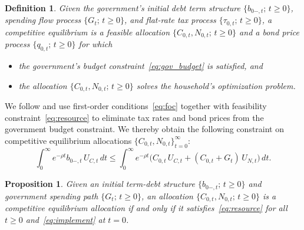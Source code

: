 \documentclass[12pt]{article}
\newtheorem{definition}{Definition}
\newtheorem{proposition}{Proposition}
\newcommand{\NW}[1]{{\textcolor{blue}{#1}}}
\newcommand{\WJ}[1]{{\textcolor{red}{#1}}}
\begin{document}
{%
{\begin{definition}\label{def:CE}
	Given the government's initial debt term structure $\{b_{0-,t};\, t \ge 0\}$, spending flow process $\{G_t;\, t \ge 0\}$, and  flat-rate tax process $\{\tau_{0,t};\, t \ge 0\}$, a competitive equilibrium is a feasible allocation $\{C_{0,t}, N_{0,t};\, t \ge 0\}$ and a bond price process $\{q_{0,t};\, t \ge 0\}$ for which
	\begin{itemize}
		\item the government's budget constraint~\eqref{eq:gov_budget} is satisfied, and
		\item the allocation $\{C_{0,t}, N_{0,t};\, t \ge 0\}$ solves the household's optimization problem.
	\end{itemize}
\end{definition}
}
We follow \cite{LucasStokey1983} and use first-order conditions~\eqref{eq:foc} together with feasibility constraint~\eqref{eq:resource} to eliminate tax rates and bond prices from the government budget constraint. We thereby obtain the following %
constraint on competitive equilibrium allocations $\{C_{0,t}, N_{0,t}\}_{t=0}^\infty$:
\begin{equation}\label{eq:implement}
\int_0^\infty e^{-\rho t} b_{0-,t}\, U_{C,t}\, dt \le \int_0^\infty e^{-\rho t}\bigl(C_{0,t}\, U_{C,t} + (C_{0,t}+G_t)\, U_{N,t}\bigr)\, dt.
\end{equation}

\begin{proposition}\label{prop:CE_characterize}
	Given an initial term-debt structure $\{b_{0-,t};\, t \ge 0\}$ and government spending path $\{G_t;\, t \ge 0\}$, an allocation $\{C_{0,t}, N_{0,t};\, t \ge 0\}$ is a competitive equilibrium allocation if and only if it satisfies~\eqref{eq:resource} for all $t \ge 0$ and~{\eqref{eq:implement}} at $t=0$.
\end{proposition}

}
\end{document}

